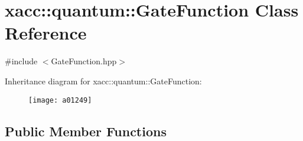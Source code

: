 \hypertarget{a01249}{}\section{xacc\+:\+:quantum\+:\+:Gate\+Function Class Reference}
\label{a01249}


{\ttfamily \#include $<$Gate\+Function.\+hpp$>$}

Inheritance diagram for xacc\+:\+:quantum\+:\+:Gate\+Function\+:\begin{figure}[H]
\begin{center}
\leavevmode
\texttt{[image: a01249]}
\end{center}
\end{figure}
\subsection*{Public Member Functions}
